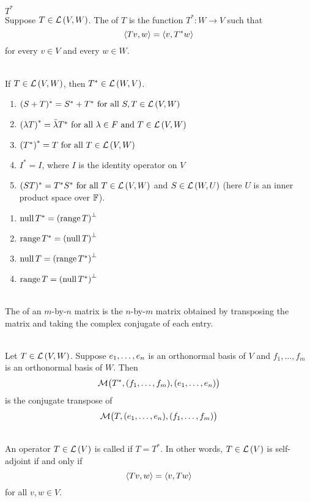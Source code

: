  $T^*$
\\Suppose $T \in \mathcal{L}\left({V,W}\right)$. The  of $T$ is the function $T^* : W \to V$ such that
$$\left\langle{Tv,w}\right\rangle = \left\langle{v,T^*w}\right\rangle$$
for every $v \in V$ and every $w \in W$.

\\
If $T \in \mathcal{L}\left({V,W}\right)$, then $T^* \in \mathcal{L}\left({W,V}\right)$.

\begin{enumerate}[label=(\alph*)]
    \item $(S+T)^*=S^* + T^* \text{ for all } S,T \in \mathcal{L}\left({V,W}\right)$
    \item $\left( {\lambda T} \right)^* = \bar{\lambda}T^* \text{ for all } \lambda \in F \text{ and } T \in \mathcal{L}\left({V,W}\right)$
    \item $\left( {T^*} \right)^* = T \text{ for all } T \in \mathcal{L}\left({V,W}\right)$
    \item $I^* = I$, where $I$ is the identity operator on $V$
    \item $(ST)^* = T^*S^* \text{ for all } T \in \mathcal{L}\left({V,W}\right)$ and $S \in \mathcal{L}\left({W,U}\right)$ (here $U$ is an inner product space over $\mathbb{F}$).
\end{enumerate}

\begin{enumerate}[label=(\alph*)]
    \item $\operatorname{null} T^* = {(\operatorname{range}{T})}^{\perp}$
    \item $\operatorname{range}{T}^* = {(\operatorname{null} T)}^{\perp}$
    \item $\operatorname{null} T = {(\operatorname{range}{T}^*)}^{\perp}$
    \item $\operatorname{range}{T} = {(\operatorname{null} T^*)}^{\perp}$
\end{enumerate}

\\The {} of an $m$-by-$n$ matrix is the $n$-by-$m$ matrix obtained by transposing the matrix and taking the complex conjugate of each entry.

\\Let $T \in \mathcal{L}\left({V,W}\right)$. Suppose ${e}_1, \dots, {e}_n$ is an orthonormal basis of $V$ and $f_1, \dots, f_m$ is an orthonormal basis of $W$. Then
$$\mathcal{M}\bigl( T^*, (f_1, \dots, f_m), ({e}_1, \dots, {e}_n) \bigr)$$
is the conjugate transpose of 
$$\mathcal{M}\bigl( T, ({e}_1, \dots, {e}_n), (f_1, \dots, f_m) \bigr)$$

\\An operator $T \in \mathcal{L}\left({V}\right)$ is called  if $T = T^*$. In other words, $T \in \mathcal{L}\left({V}\right)$ is self-adjoint if and only if
$$\left\langle{Tv,w}\right\rangle = \left\langle{v,Tw}\right\rangle$$
for all $v,w \in V$.


